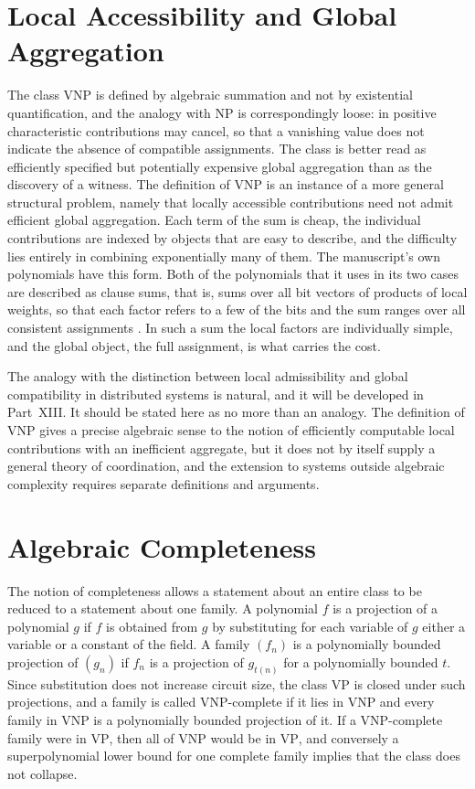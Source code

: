 \documentclass[11pt,letterpaper]{report}
\theoremstyle{plain}
\theoremstyle{definition}
\theoremstyle{remark}
\newcommand{\VP}{\mathrm{VP}}
\newcommand{\VNP}{\mathrm{VNP}}
\newcommand{\NP}{\mathrm{NP}}
\begin{document}
\section{Local Accessibility and Global Aggregation}

The class $\VNP$ is defined by algebraic summation and not by existential quantification, and the analogy with $\NP$ is correspondingly loose: in positive characteristic contributions may cancel, so that a vanishing value does not indicate the absence of compatible assignments. The class is better read as efficiently specified but potentially expensive global aggregation than as the discovery of a witness. The definition of $\VNP$ is an instance of a more general structural problem, namely that locally accessible contributions need not admit efficient global aggregation. Each term of the sum is cheap, the individual contributions are indexed by objects that are easy to describe, and the difficulty lies entirely in combining exponentially many of them. The manuscript's own polynomials have this form. Both of the polynomials that it uses in its two cases are described as clause sums, that is, sums over all bit vectors of products of local weights, so that each factor refers to a few of the bits and the sum ranges over all consistent assignments \cite{Source2026}. In such a sum the local factors are individually simple, and the global object, the full assignment, is what carries the cost.

The analogy with the distinction between local admissibility and global compatibility in distributed systems is natural, and it will be developed in Part~XIII. It should be stated here as no more than an analogy. The definition of $\VNP$ gives a precise algebraic sense to the notion of efficiently computable local contributions with an inefficient aggregate, but it does not by itself supply a general theory of coordination, and the extension to systems outside algebraic complexity requires separate definitions and arguments.

\section{Algebraic Completeness}

The notion of completeness allows a statement about an entire class to be reduced to a statement about one family. A polynomial $f$ is a projection of a polynomial $g$ if $f$ is obtained from $g$ by substituting for each variable of $g$ either a variable or a constant of the field. A family $(f_n)$ is a polynomially bounded projection of $(g_n)$ if $f_n$ is a projection of $g_{t(n)}$ for a polynomially bounded $t$. Since substitution does not increase circuit size, the class $\VP$ is closed under such projections, and a family is called $\VNP$-complete if it lies in $\VNP$ and every family in $\VNP$ is a polynomially bounded projection of it. If a $\VNP$-complete family were in $\VP$, then all of $\VNP$ would be in $\VP$, and conversely a superpolynomial lower bound for one complete family implies that the class does not collapse.
\end{document}

